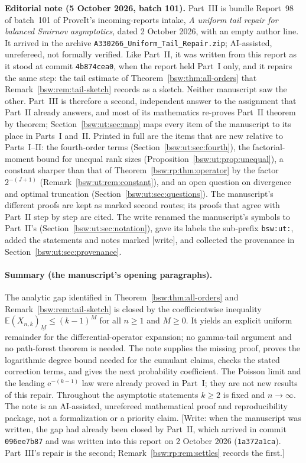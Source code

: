 \documentclass[11pt,letterpaper]{article}
\theoremstyle{definition}
\theoremstyle{remark}
\newcommand{\EE}{\mathbb E}
\newcommand{\ee}{\mathrm e}
\newcommand{\fall}[2]{(#1)_{\underline{#2}}}
\begin{document}
{\small\textbf{Editorial note (5 October 2026, batch 101).}
Part~III is bundle Report~98 of batch~101 of ProveIt's incoming-reports
intake, \emph{A uniform tail repair for balanced Smirnov asymptotics}, dated
2 October 2026, with an empty author line.  It arrived in the archive
\texttt{A330266\_Uniform\_Tail\_Repair.zip}; AI-assisted, unrefereed, not
formally verified.  Like Part~II, it was written from this report as it
stood at commit \texttt{4b874cea0}, when the report held Part~I only, and it
repairs the same step: the tail estimate of
Theorem~\ref{bsw:thm:all-orders} that Remark~\ref{bsw:rem:tail-sketch}
records as a sketch.  Neither manuscript saw the other.  Part~III is
therefore a second, independent answer to the assignment that Part~II
already answers, and most of its mathematics re-proves Part~II theorem by
theorem; Section~\ref{bsw:ut:sec:map} maps every item of the manuscript to
its place in Parts~I and~II.  Printed in full are the items that are new
relative to Parts~I--II: the fourth-order terms
(Section~\ref{bsw:ut:sec:fourth}), the factorial-moment bound for unequal
rank sizes (Proposition~\ref{bsw:ut:prop:unequal}), a constant sharper than
that of Theorem~\ref{bsw:rp:thm:operator} by the factor $2^{-(J+1)}$
(Remark~\ref{bsw:ut:rem:constant}), and an open question on divergence and
optimal truncation (Section~\ref{bsw:ut:sec:questions}).  The manuscript's
different proofs are kept as marked second routes; its proofs that agree
with Part~II step by step are cited.  The write renamed the manuscript's
symbols to Part~II's (Section~\ref{bsw:ut:sec:notation}), gave its labels
the sub-prefix \texttt{bsw:ut:}, added the statements and notes marked
[write], and collected the provenance in
Section~\ref{bsw:ut:sec:provenance}.\par}

\paragraph{Summary (the manuscript's opening paragraphs).}
The analytic gap identified in Theorem~\ref{bsw:thm:all-orders} and
Remark~\ref{bsw:rem:tail-sketch} is closed by the coefficientwise
inequality $\EE\fall{X_{n,k}}M\le(k-1)^M$ for all $n\ge1$ and $M\ge0$.  It
yields an explicit uniform remainder for the differential-operator
expansion; no gamma-tail argument and no path-forest theorem is needed.  The
note supplies the missing proof, proves the logarithmic degree bound needed
for the cumulant claims, checks the stated correction terms, and gives the
next probability coefficient.  The Poisson limit and the leading
$\ee^{-(k-1)}$ law were already proved in Part~I; they are not new results
of this repair.  Throughout the asymptotic statements $k\ge2$ is fixed and
$n\to\infty$.  The note is an AI-assisted, unrefereed mathematical proof and
reproducibility package, not a formalization or a priority claim.
[Write: when the manuscript was written, the gap had already been closed by
Part~II, which arrived in commit \texttt{096ee7b87} and was written into
this report on 2 October 2026 (\texttt{1a372a1ca}).  Part~III's repair is
the second; Remark~\ref{bsw:rp:rem:settles} records the first.]
\end{document}
